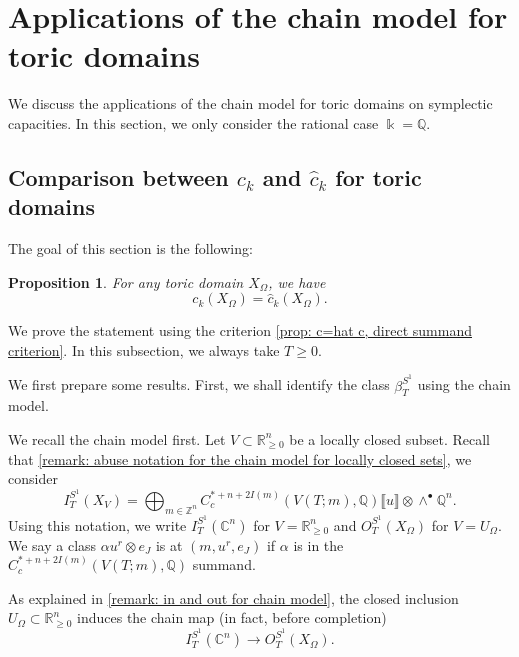\documentclass[11pt]{amsart}
\numberwithin{equation}{section}
\theoremstyle{plain}
\newtheorem{Prop}[prop]{Proposition}
\theoremstyle{definition}
\theoremstyle{remark}
\newcommand{\bC} { {\mathbb{C}}}
\newcommand{\bQ} { {\mathbb{Q}}}
\newcommand{\bZ} { {\mathbb{Z}}}
\newcommand{\bR} { {\mathbb{R}}}
\newcommand{\fpw}[1]{{\llbracket #1\rrbracket}}
\begin{document}
\section{Applications of the chain model for toric domains}\label{section: application of the chain model}
We discuss the applications of the chain model for toric domains on symplectic capacities. In this section, we only consider the rational case $\Bbbk=\bQ$.

\subsection{\texorpdfstring{Comparison between $c_k$ and $\widehat{c}_k$ for toric domains}{}}
The goal of this section is the following:
\begin{Prop}\label{prop: toric c = hat_c in general}
  For any toric domain $X_\Omega$, we have  
  \[c_k(X_\Omega)=\widehat{c}_k(X_\Omega).\]
\end{Prop}
We prove the statement using the criterion \autoref{prop: c=hat c, direct summand criterion}. In this subsection, we always take $T\geq 0$.

We first prepare some results. First, we shall identify the class $\beta_T^{S^1}$ using the chain model.


We recall the chain model first. Let $V\subset \bR^n_{\geq0}$ be a locally closed subset. Recall that \autoref{remark: abuse notation for the chain model for locally closed sets}, we consider 
\[I_{T}^{S^1}(X_V) = \bigoplus_{m\in \bZ^n} C_c^{*+n+2I(m)} (V (T;m),\bQ) \fpw{u} \otimes \wedge ^\bullet \bQ ^n.\]
Using this notation, we write $I^{S^1}_{T}(\bC^n)$ for $V=\bR^n_{\geq0}$ and $O^{S^1}_{T}(X_\Omega)$ for $V=U_\Omega$. We say a class $\alpha u^r\otimes e_J$ is at $(m,u^r,e_J)$ if $\alpha$ is in the $C_c^{*+n+2I(m)} (V(T;m),\bQ)$ summand.

As explained in \autoref{remark: in and out for chain model}, the closed inclusion $U_\Omega\subset \bR^n_{\geq0}$ induces the chain map (in fact, before completion)
\begin{equation}\label{equation: chain map in toric capacity comparison}
    I^{S^1}_{T}(\bC^n) \to O^{S^1}_{T}(X_\Omega).
\end{equation}
\end{document}
